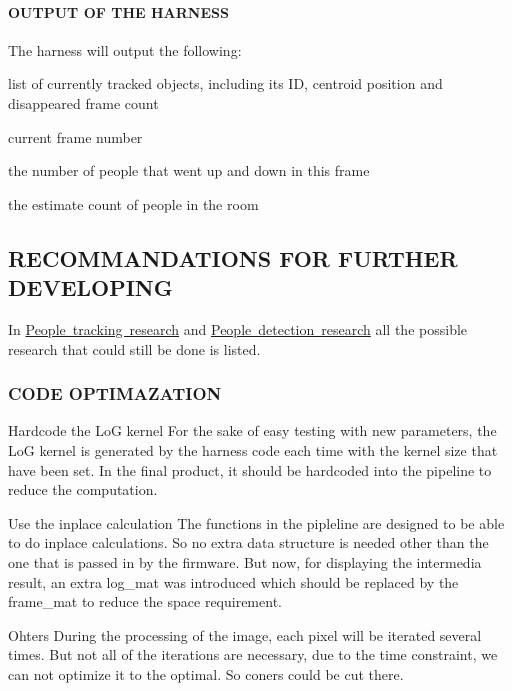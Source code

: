 \paragraph*{O\+U\+T\+P\+UT OF T\+HE H\+A\+R\+N\+E\+SS}

The harness will output the following\+:
\begin{DoxyItemize}
\item list of currently tracked objects, including its ID, centroid position and disappeared frame count
\item current frame number
\item the number of people that went up and down in this frame
\item the estimate count of people in the room
\end{DoxyItemize}

\subsection*{R\+E\+C\+O\+M\+M\+A\+N\+D\+A\+T\+I\+O\+NS F\+OR F\+U\+R\+T\+H\+ER D\+E\+V\+E\+L\+O\+P\+I\+NG}

In \mbox{\hyperlink{tracking_research}{People tracking research}} and \mbox{\hyperlink{detection_research}{People detection research}} all the possible research that could still be done is listed.

\subsubsection*{C\+O\+DE O\+P\+T\+I\+M\+A\+Z\+A\+T\+I\+ON}


\begin{DoxyEnumerate}
\item Hardcode the LoG kernel For the sake of easy testing with new parameters, the LoG kernel is generated by the harness code each time with the kernel size that have been set. In the final product, it should be hardcoded into the pipeline to reduce the computation.
\item Use the inplace calculation The functions in the pipleline are designed to be able to do inplace calculations. So no extra data structure is needed other than the one that is passed in by the firmware. But now, for displaying the intermedia result, an extra log\+\_\+mat was introduced which should be replaced by the frame\+\_\+mat to reduce the space requirement.
\item Ohters During the processing of the image, each pixel will be iterated several times. But not all of the iterations are necessary, due to the time constraint, we can not optimize it to the optimal. So coners could be cut there.
\end{DoxyEnumerate}

